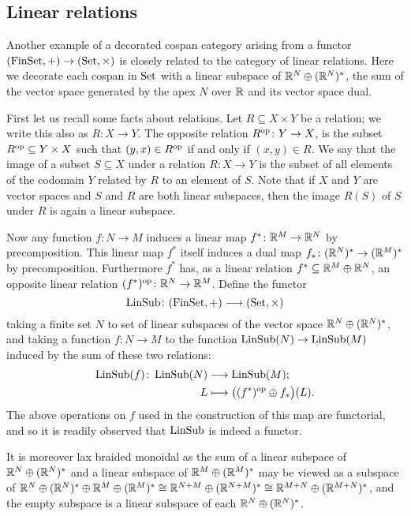 \subsection{Linear relations} 
Another example of a decorated cospan category arising from a functor $(\mathrm{FinSet},+)
\to (\mathrm{Set}, \times)$ is closely related to the category of linear relations. Here
we decorate each cospan in $\mathrm{Set}$ with a linear subspace of ${\mathbb{R}}^N \oplus
({\mathbb{R}}^N)^\ast$, the sum of the vector space generated by the apex $N$ over ${\mathbb{R}}$
and its vector space dual.

First let us recall some facts about relations. Let $R \subseteq X\times Y$ be
a relation; we write this also as $R\colon  X \to Y$. The opposite relation $R^{\mathrm{op}}\colon 
Y\to X$, is the subset $R^{\mathrm{op}} \subseteq Y\times X$ such that $(y,x) \in R^{\mathrm{op}}$
if and only if $(x,y) \in R$. We say that the image of a subset $S \subseteq X$
under a relation $R\colon  X \to Y$ is the subset of all elements of the codomain $Y$
related by $R$ to an element of $S$. Note that if $X$ and $Y$ are vector spaces
and $S$ and $R$ are both linear subspaces, then the image $R(S)$ of $S$ under
$R$ is again a linear subspace.

Now any function $f\colon N \to M$ induces a linear map $f^\ast\colon  {\mathbb{R}}^M \to
{\mathbb{R}}^N$ by precomposition. This linear map $f^\ast$ itself induces a dual map
$f_\ast\colon ({\mathbb{R}}^N)^\ast \to ({\mathbb{R}}^M)^\ast$ by precomposition. Furthermore
$f^\ast$ has, as a linear relation $f^\ast \subseteq {\mathbb{R}}^M \oplus {\mathbb{R}}^N$, an
opposite linear relation $(f^\ast)^{\mathrm{op}}\colon  {\mathbb{R}}^N \to {\mathbb{R}}^M$.  Define the
functor 
\[
  \operatorname{LinSub}\colon  (\mathrm{FinSet},+) \longrightarrow (\mathrm{Set},\times)
\]
taking a finite set $N$ to set of linear subspaces of the vector space ${\mathbb{R}}^N
\oplus ({\mathbb{R}}^N)^\ast$, and taking a function $f\colon  N \to M$ to the function
$\operatorname{LinSub}(N) \to \operatorname{LinSub}(M)$ induced by the sum of these two relations:
\begin{align*}
  \operatorname{LinSub}(f)\colon  \operatorname{LinSub}(N) &\longrightarrow \operatorname{LinSub}(M); \\
  L &\longmapsto \big((f^\ast)^{\mathrm{op}} \oplus f_\ast\big)(L).
\end{align*}
The above operations on $f$ used in the construction of this map are functorial,
and so it is readily observed that $\operatorname{LinSub}$ is indeed a functor.

It is moreover lax braided monoidal as the sum of a linear subspace of ${\mathbb{R}}^N
\oplus ({\mathbb{R}}^N)^\ast$ and a linear subspace of ${\mathbb{R}}^M \oplus ({\mathbb{R}}^M)^\ast$ may be
viewed as a subspace of ${\mathbb{R}}^N \oplus ({\mathbb{R}}^N)^\ast \oplus {\mathbb{R}}^M \oplus ({\mathbb{R}}^M)^\ast
\cong {\mathbb{R}}^{N+M} \oplus ({\mathbb{R}}^{N+M})^\ast \cong {\mathbb{R}}^{M+N} \oplus ({\mathbb{R}}^{M+N})^\ast$,
and the empty subspace is a linear subspace of each ${\mathbb{R}}^N \oplus ({\mathbb{R}}^N)^\ast$.

